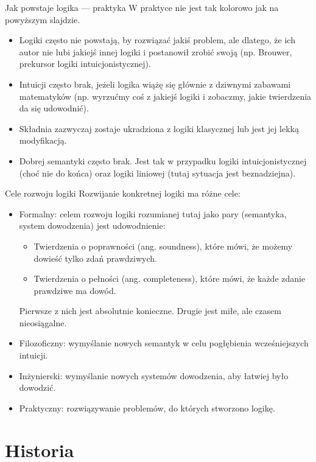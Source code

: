 \documentclass{beamer}
\begin{document}
\begin{frame}{Jak powstaje logika — praktyka}
W praktyce nie jest tak kolorowo jak na powyższym slajdzie.
\begin{itemize}
	\item Logiki często nie powstają, by rozwiązać jakiś problem, ale dlatego, że ich autor nie lubi jakiejś innej logiki i postanowił zrobić swoją (np. Brouwer, prekursor logiki intuicjonistycznej).
	\item Intuicji często brak, jeżeli logika wiążę się głównie z dziwnymi zabawami matematyków (np. wyrzućmy coś z jakiejś logiki i zobaczmy, jakie twierdzenia da się udowodnić).
	\item Składnia zazwyczaj zostaje ukradziona z logiki klasycznej lub jest jej lekką modyfikacją.
	\item Dobrej semantyki często brak. Jest tak w przypadku logiki intuicjonistycznej (choć nie do końca) oraz logiki liniowej (tutaj sytuacja jest beznadziejna).
\end{itemize}
\end{frame}

\begin{frame}{Cele rozwoju logiki}
Rozwijanie konkretnej logiki ma różne cele:
\begin{itemize}
	\item Formalny: celem rozwoju logiki rozumianej tutaj jako pary (semantyka, system dowodzenia) jest udowodnienie:
	\begin{itemize}
		\item Twierdzenia o poprawności (ang. soundness), które mówi, że możemy dowieść tylko zdań prawdziwych.
		\item Twierdzenia o pełności (ang. completeness), które mówi, że każde zdanie prawdziwe ma dowód.
	\end{itemize}
		Pierwsze z nich jest absolutnie konieczne. Drugie jest miłe, ale czasem nieosiągalne.
	\item Filozoficzny: wymyślanie nowych semantyk w celu pogłębienia wcześniejszych intuicji.
	\item Inżynierski: wymyślanie nowych systemów dowodzenia, aby łatwiej było dowodzić.
	\item Praktyczny: rozwiązywanie problemów, do których stworzono logikę.
\end{itemize}
\end{frame}

\section{Historia}
\end{document}
